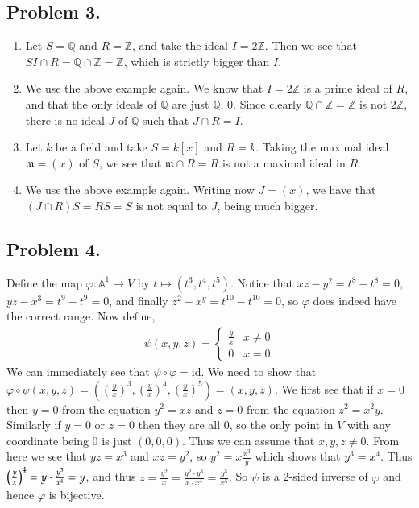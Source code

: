 \documentclass[12pt]{article}
\theoremstyle{definitionstyle}
\def\mbb#1{\mathbb{#1}}
\def\cph{\varphi}
\newcommand{\Z}{\mbb Z}
\newcommand{\Q}{\mbb Q}
\newcommand{\id}{\mathrm{id}}
\newcommand{\A}{\mathbb{A}}
\begin{document}
    \subsection*{Problem 3.}
    \begin{enumerate}[label=(\alph*)]
        \item Let $S = \Q$ and $R = \Z$, and take the ideal $I = 2\Z$. Then we see that $SI \cap R = \Q \cap \Z = \Z$, which is strictly bigger than $I$.
        \item We use the above example again. We know that $I = 2\Z$ is a prime ideal of $R$, and that the only ideals of $\Q$ are just $\Q$, $0$. Since clearly $\Q \cap \Z = \Z$ is not $2\Z$, there is no ideal $J$ of $\Q$ such that $J \cap R = I$.
        \item Let $k$ be a field and take $S = k[x]$ and $R = k$. Taking the maximal ideal $\mathfrak{m} = (x)$ of $S$, we see that $\mathfrak m \cap R = R$ is not a maximal ideal in $R$.
        \item We use the above example again. Writing now $J = (x)$, we have that $(J \cap R)S = RS = S$ is not equal to $J$, being much bigger.
    \end{enumerate}

    \subsection*{Problem 4.}
    Define the map $\cph: \A^1 \to V$ by $t \mapsto (t^3,t^4,t^5)$. Notice that $xz-y^2 = t^8 - t^8 = 0$, $yz-x^3 = t^9 - t^9 = 0$, and finally $z^2 - x^y = t^{10} - t^{10} = 0$, so $\cph$ does indeed have the correct range. Now define,
    \begin{align*}
        \psi(x, y, z) = \begin{cases}
            \frac{y}{x} & x \neq 0 \\
            0 & x = 0
        \end{cases}
    \end{align*}
    We can immediately see that $\psi \circ \cph = \id$. We need to show that $\cph \circ \psi(x,y,z) = ((\frac{y}{x})^3, (\frac{y}{x})^4, (\frac{y}{x})^5) = (x,y,z)$. We first see that if $x = 0$ then $y = 0$ from the equation $y^2 = xz$ and $z = 0$ from the equation $z^2=x^2y$. Similarly if $y = 0$ or $z = 0$ then they are all 0, so the only point in $V$ with any coordinate being 0 is just $(0,0,0)$. Thus we can assume that $x,y,z \neq 0$. From here we see that $yz = x^3$ and $xz = y^2$, so $y^2 = x\frac{x^3}{y}$ which shows that $y^3 = x^4$. Thus $\qty(\frac{y}{x})^4 = y \cdot \frac{y^3}{x^4} = y$, and thus $z = \frac{y^2}{x} = \frac{y^2 \cdot y^3}{x \cdot x^4} = \frac{y^5}{x^5}$. So $\psi$ is a 2-sided inverse of $\cph$ and hence $\cph$ is bijective.
\end{document}
